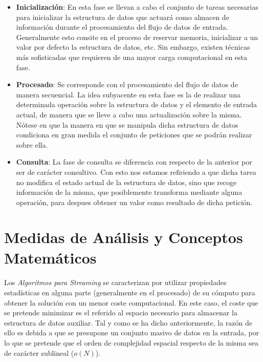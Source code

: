 \documentclass{subfiles}
\begin{document}
      \begin{itemize}

        \item \textbf{Inicialización}: En esta fase se llevan a cabo el conjunto de tareas necesarias para inicializar la estructura de datos que actuará como almacen de información durante el procesamiento del flujo de datos de entrada. Generalmente esto consite en el proceso de reservar memoria, inicializar a un valor por defecto la estructura de datos, etc. Sin embargo, existen técnicas más sofisticadas que requieren de una mayor carga computacional en esta fase.

        \item \textbf{Procesado}: Se corresponde con el procesamiento del flujo de datos de manera secuencial. La idea subyacente en esta fase es la de realizar una determinada operación sobre la estructura de datos y el elemento de entrada actual, de manera que se lleve a cabo una actualización sobre la misma. Nótese en que la manera en que se manipula dicha estructura de datos condiciona en gran medida el conjunto de peticiones que se podrán realizar sobre ella.

        \item \textbf{Consulta}: La fase de consulta se diferencia con respecto de la anterior por ser de carácter consultivo. Con esto nos estamos refiriendo a que dicha tarea no modifica el estado actual de la estructura de datos, sino que recoge información de la misma, que posiblemente transforma mediante alguna operación, para despues obtener un valor como resultado de dicha petición.

      \end{itemize}

    \section{Medidas de Análisis y Conceptos Matemáticos}
    \label{sec:streaming_analysis}

      \paragraph{}
      Los \emph{Algoritmos para Streaming} se caracterizan por utilizar propiedades estadísticas en alguna parte (generalmente en el procesado) de su cómputo para obtener la solución con un menor coste computacional. En este caso, el coste que se pretende minimizar es el referido al espacio necesario para almacenar la estructura de datos auxiliar. Tal y como se ha dicho anteriormente, la razón de ello es debida a que se presupone un conjunto masivo de datos en la entrada, por lo que se pretende que el orden de complejidad espacial respecto de la misma sea de carácter sublineal ($o(N)$).
\end{document}
